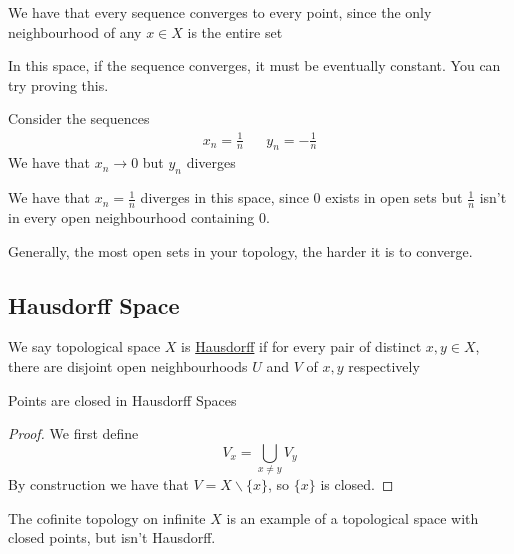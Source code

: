 \begin{example}
    We have that every sequence converges to every point, since the only neighbourhood of any $x\in X$ is the entire set 
\end{example}
\begin{example}
    In this space, if the sequence converges, it must be eventually constant. You can try proving this.
\end{example}
\begin{example}
    Consider the sequences
    \begin{align*}
        x_n = \frac{1}{n} &&y_n = -\frac{1}{n}
    \end{align*}
    We have that $x_n\to 0$ but $y_n$ diverges
\end{example}
\begin{example}[$K$-Topology]
    We have that $x_n=\frac{1}{n}$ diverges in this space, since $0$ exists in open sets but $\frac{1}{n}$ isn't in every open neighbourhood containing 0.
\end{example}
\begin{remark}
    Generally, the most open sets in your topology, the harder it is to converge.
\end{remark}
\subsection{Hausdorff Space}
\begin{definition}
    We say topological space $X$ is \href{https://en.wikipedia.org/wiki/Hausdorff_space}{Hausdorff} if for every pair of distinct $x,y\in X$, there are disjoint open neighbourhoods $U$ and $V$ of $x,y$ respectively
\end{definition}
\begin{theorem}
    Points are closed in Hausdorff Spaces
\end{theorem}
\begin{proof}
    We first define
    \[ V_x=\bigcup_{x\neq y}V_y\]
    By construction we have that  $V=X\backslash \{x\}$, so $\{x\}$ is closed.
\end{proof}
\begin{example}
    The cofinite topology on infinite $X$ is an example of a topological space with closed points, but isn't Hausdorff.
\end{example}